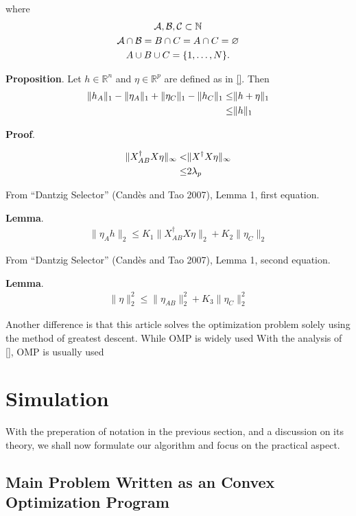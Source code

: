 \documentclass[12pt]{article}
\newcounter{numResult}
\begin{document}
where
\begin{gather}
\mathcal{A}, \mathcal{B}, \mathcal{C} \subset \mathbb{N} \\ \notag
\mathcal{A} \cap \mathcal{B} =B \cap C =A \cap C =\varnothing \\ \notag
A \cup B \cup C =\{1, \dotsc, N\}.
\end{gather}


\textbf{Proposition}.
Let \(h \in \mathbb{R}^n\) and \(\eta \in \mathbb{R}^p\) are defined as in \eqref{}.
Then
\begin{align}
\|h_A\|_1 -\|\eta_A\|_1 +\|\eta_C\|_1 -\|h_C\|_1
\leq& \|h +\eta\|_1 \\ \notag
\leq& \|h\|_1
\end{align}

\textbf{Proof}.


\begin{align}
\|X^\dagger_{AB} X \eta\|_\infty
<&\|X^\dagger X \eta\|_\infty \\ \notag
\leq& 2 \lambda_p
\end{align}

From ``Dantzig Selector'' (Cand\`es and Tao 2007), Lemma 1, first equation.

\textbf{Lemma}.
\begin{align}
\|\eta_Ah\|_2
\leq K_1 \|X^\dagger_{AB} X \eta\|_2 +K_2 \|\eta_C\|_2
\end{align}


From ``Dantzig Selector'' (Cand\`es and Tao 2007), Lemma 1, second equation.

\textbf{Lemma}.
\begin{align}
\|\eta\|_2^2
\leq \|\eta_{AB}\|_2^2 +K_3 \|\eta_C\|_2^2
\end{align}

Another difference is that this article solves the optimization problem solely using the method of greatest descent.
While OMP is widely used 
With the analysis of [], OMP is usually used


\section{Simulation}

With the preperation of notation in the previous section, and a discussion on its theory, we shall now formulate our algorithm and focus on the practical aspect.

\subsection{Main Problem Written as an Convex Optimization Program}
\end{document}
